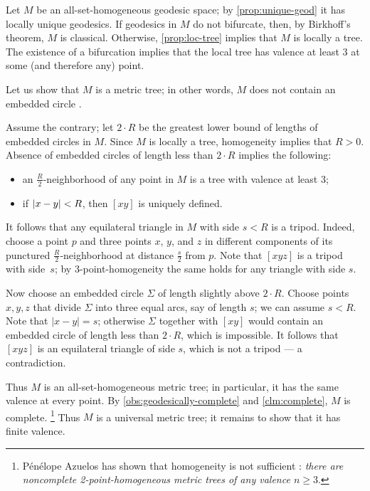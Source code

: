 \documentclass[leqno,a4paper,10pt]{article}
\begin{document}
Let $M$ be an all-set-homogeneous geodesic space;
by \ref{prop:unique-geod} it has locally unique geodesics.
If geodesics in $M$ do not bifurcate, then, by Birkhoff's theorem, $M$ is classical.
Otherwise, \ref{prop:loc-tree} implies that $M$ is locally a tree.
The existence of a bifurcation implies that the local tree has valence at least $3$ at some (and therefore any) point.

Let us show that $M$ is a metric tree;
in other words, $M$ does not contain an embedded circle \cite[2.2.3]{chiswell}.

Assume the contrary; let $2\cdot R$ be the greatest lower bound of lengths of embedded circles in $M$.
Since $M$ is locally a tree, homogeneity implies that $R>0$.
Absence of embedded circles of length less than $2\cdot R$ implies the following:
\begin{itemize}
\item an $\tfrac R2$-neighborhood of any point in $M$ is a tree with valence at least $3$;
\item if $|x-y|\z<R$, then $[xy]$ is uniquely defined.
\end{itemize}

It follows that any equilateral triangle in $M$ with side $s<R$ is a tripod.
Indeed, choose a point $p$ and three points $x$, $y$, and $z$ in different components of its punctured $\tfrac R2$-neighborhood at distance $\tfrac s2$ from $p$.
Note that $[xyz]$ is a tripod with side~$s$;
by $3$-point-homogeneity the same holds for any triangle with side $s$.

Now choose an embedded circle $\Sigma$ of length slightly above $2\cdot R$.
Choose points $x,y,z$ that divide $\Sigma$ into three equal arcs, say of length $s$;
we can assume  $s<R$.
Note that $|x-y|=s$; otherwise $\Sigma$ together with $[xy]$ would contain an embedded circle of length less than $2\cdot R$,
which is impossible.
It follows that $[xyz]$ is an equilateral triangle of side $s$,
which is not a tripod --- a contradiction.

Thus $M$ is an all-set-homogeneous metric tree;
in particular, it has the same valence at every point.
By \ref{obs:geodesically-complete} and \ref{clm:complete}, $M$ is complete.%
\footnote{Pénélope Azuelos has shown that homogeneity is not sufficient \cite{azuelos2025}:
\emph{there are noncomplete 2-point-homogeneous metric trees  of any valence $n\ge 3$}.}
Thus $M$ is a universal metric tree;
it remains to show that it has finite valence.
\end{document}
